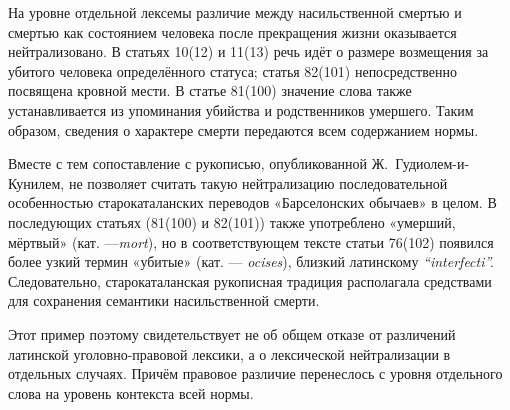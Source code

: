 На уровне отдельной лексемы различие между насильственной смертью и смертью как состоянием человека после прекращения жизни оказывается нейтрализовано. В статьях 10(12) и 11(13) речь идёт о размере возмещения за убитого человека определённого статуса; статья 82(101) непосредственно посвящена кровной мести. В статье 81(100) значение слова также устанавливается из упоминания убийства и родственников умершего. Таким образом, сведения о характере смерти передаются всем содержанием нормы.

Вместе с тем сопоставление с рукописью, опубликованной Ж.~Гудиолем-и-Кунилем, не позволяет считать такую нейтрализацию последовательной особенностью старокаталанских переводов «Барселонских обычаев» в целом. В последующих статьях (81(100) и 82(101)) также употреблено «умерший, мёртвый» (кат. ---\emph{mort}), но в соответствующем тексте статьи 76(102) появился более узкий термин «убитые» (кат. --- \emph{ocises}), близкий латинскому \emph{“}\emph{interfecti}\emph{”}\emph{.} Следовательно, старокаталанская рукописная традиция располагала средствами для сохранения семантики насильственной смерти.

Этот пример поэтому свидетельствует не об общем отказе от различений латинской уголовно-правовой лексики, а о лексической нейтрализации в отдельных случаях. Причём правовое различие перенеслось с уровня отдельного слова на уровень контекста всей нормы.

